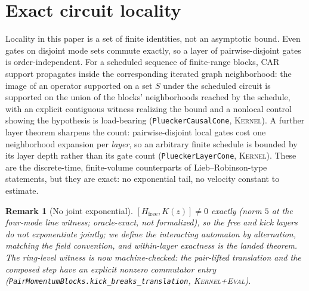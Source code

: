 \documentclass[11pt]{article}
\newcommand{\Kernel}{\textcolor{kernelcolor}{\textsc{Kernel}}}
\newcommand{\DraftTrust}{\textcolor{draftcolor}{\textsc{Kernel+Eval}}}
\newtheorem{remark}{Remark}
\begin{document}
\section{Exact circuit locality}

Locality in this paper is a set of finite identities, not an asymptotic
bound.  Even gates on disjoint mode sets commute exactly, so a layer of
pairwise-disjoint gates is order-independent.  For a scheduled sequence
of finite-range blocks, CAR support propagates inside the corresponding
iterated graph neighborhood: the image of an operator supported on a
set $S$ under the scheduled circuit is supported on the union of the
blocks' neighborhoods reached by the schedule, with an explicit
contiguous witness realizing the bound and a nonlocal control showing
the hypothesis is load-bearing (\texttt{PlueckerCausalCone}, \Kernel{}).
A further layer theorem sharpens the count: pairwise-disjoint local
gates cost one neighborhood expansion per \emph{layer}, so an arbitrary
finite schedule is bounded by its layer depth rather than its gate
count (\texttt{PlueckerLayerCone}, \Kernel{}).  These are the
discrete-time, finite-volume counterparts of Lieb--Robinson-type
statements, but they are exact: no exponential tail, no velocity
constant to estimate.

\begin{remark}[No joint exponential]
$[H_{\mathrm{free}},K(z)]\neq0$ exactly (norm $5$ at the four-mode line
witness; oracle-exact, not formalized), so the free and kick layers do
not exponentiate jointly; we \emph{define} the interacting automaton by
alternation, matching the field convention, and within-layer exactness
is the landed theorem.  The ring-level witness is now machine-checked:
the pair-lifted translation and the composed step have an explicit
nonzero commutator entry
(\texttt{PairMomentumBlocks.kick\_breaks\_translation}, \DraftTrust{}).
\end{remark}
\end{document}
